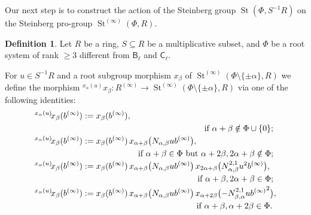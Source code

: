 \documentclass[oneside, 11pt]{amsart}
\numberwithin{equation}{section}
\theoremstyle{definition}
\newtheorem{df}[lemma]{Definition} \Crefname{df}{Definition}{Definitions}
\theoremstyle{remark}
\DeclareMathOperator\St{St}
\newcommand{\up}[2]{{^{#1}\!{#2}}}
\newcommand{\rB}{\mathsf{B}}
\newcommand{\rC}{\mathsf{C}}
\begin{document}
Our next step is to construct the action of the Steinberg group $\St(\Phi, S^{-1}R)$ on the Steinberg pro-group $\St^{(\infty)}(\Phi, R)$.
\begin{df}\label{root-action}
 Let \(R\) be a ring, \(S \subseteq R\) be a multiplicative subset, and \(\Phi\) be a root system of rank \(\geq 3\) different from \(\rB_\ell\) and \(\rC_\ell\).
 
 For $u \in S^{-1}R$ and a root subgroup morphism $x_\beta$ of $\St^{(\infty)}(\Phi\setminus\{\pm\alpha\}, R)$ we define the morphism 
 $\up{x_\alpha(u)}x_\beta \colon R^{(\infty)} \to \St^{(\infty)}(\Phi\setminus\{\pm\alpha\}, R)$
 via one of the following identities:
 \begin{align*}
 \up{x_\alpha(u)}{x_\beta(b^{(\infty)})}
 &:= x_\beta(b^{(\infty)}), \\
 \multispan2{\hfil if $\alpha + \beta \notin \Phi \cup \{0\}$;} \\
 \up{x_\alpha(u)}{x_\beta(b^{(\infty)})}
 &:= x_\beta(b^{(\infty)})\,
 x_{\alpha + \beta}\bigl(N_{\alpha, \beta} u b^{(\infty)}\bigr), \\
 \multispan2{\hfill if $\alpha + \beta \in \Phi$ but $\alpha + 2\beta, 2\alpha + \beta \notin \Phi$;} \\
 \up{x_\alpha(u)}{x_\beta(b^{(\infty)})}
 &:= x_\beta(b^{(\infty)})\,
  x_{\alpha + \beta}\bigl(N_{\alpha, \beta} u b^{(\infty)}\bigr)\,
  x_{2\alpha + \beta}\bigl(N^{2,1}_{\alpha, \beta} u^2 b^{(\infty)}\bigr), \\
 \multispan2{\hfill if $\alpha + \beta, 2\alpha + \beta \in \Phi$;} \\
 \up{x_\alpha(u)}{x_\beta(b^{(\infty)})}
 &:= x_\beta(b^{(\infty)})\,
  x_{\alpha + \beta}\bigl(N_{\alpha, \beta} u b^{(\infty)}\bigr)\,
  x_{\alpha + 2\beta}\bigl(-N^{2,1}_{\beta, \alpha} u {b^{(\infty)}}^2\bigr), \\
 \multispan2{\hfill if $\alpha + \beta, \alpha + 2\beta \in \Phi$.}
 \end{align*} 
\end{df}
\end{document}
